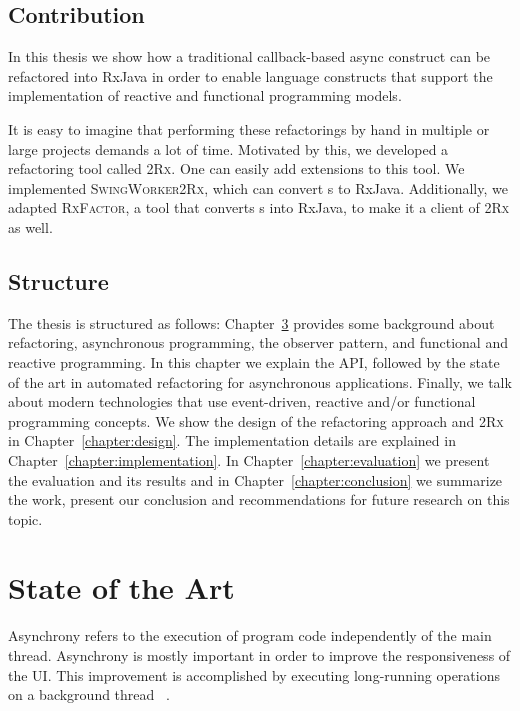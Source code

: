 \documentclass[type=bsc,accentcolor=tud9c]{tudthesis}
\newcommand{\framework}[1]{\textcolor{black!65}{#1}}
\newcommand{\toolcore}{\textsc{2Rx}}
\newcommand{\toolextension}{\textsc{SwingWorker2Rx}}
\begin{document}
\section{Contribution}

In this thesis we show how a traditional callback-based async construct can be refactored into \framework{RxJava} in order to enable language constructs that support the implementation of reactive and functional programming models. 

It is easy to imagine that performing these refactorings by hand in multiple or large projects demands a lot of time. Motivated by this, we developed a refactoring tool called \toolcore{}. One can easily add extensions to this tool. We implemented \toolextension{}, which can convert s to \framework{RxJava}. Additionally, we adapted \textsc{RxFactor}, a tool that converts s into \framework{RxJava}, to make it a client of \toolcore{} as well.

\section{Structure}
The thesis is structured as follows: Chapter~\ref{chapter:stateOfTheArt} provides some background about refactoring, asynchronous programming, the observer pattern, and functional and reactive programming. In this chapter we explain the  API, followed by the state of the art in automated refactoring for asynchronous applications. Finally, we talk about modern technologies that use event-driven, reactive and/or functional programming concepts. We show the design of the refactoring approach and \toolcore{} in Chapter~\ref{chapter:design}. The implementation details are explained in Chapter~\ref{chapter:implementation}. In Chapter~\ref{chapter:evaluation} we present the evaluation and its results and in Chapter~\ref{chapter:conclusion} we summarize the work, present our conclusion and recommendations for future research on this topic.

\chapter{State of the Art}
\label{chapter:stateOfTheArt}
Asynchrony refers to the execution of program code independently of the main thread. Asynchrony is mostly important in order to improve the responsiveness of the UI. This improvement is accomplished by executing long-running operations on a background thread ~\cite{paperAsyncMobile, asyncProgramming}.
\end{document}
